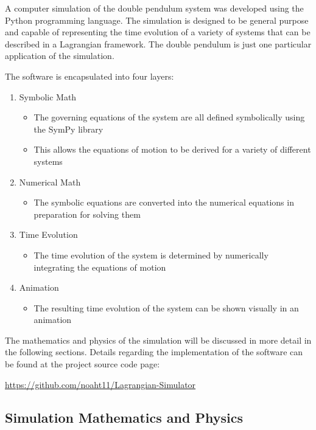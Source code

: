 A computer simulation of the double pendulum system was developed using the Python programming language. The simulation is designed to be general purpose and capable of representing the time evolution of a variety of systems that can be described in a Lagrangian framework. The double pendulum is just one particular application of the simulation.

The software is encapsulated into four layers:

\begin{enumerate}
    \item Symbolic Math
        \begin{itemize}
            \item The governing equations of the system are all defined symbolically using the SymPy library
            \item This allows the equations of motion to be derived for a variety of different systems
        \end{itemize}
    \item Numerical Math
        \begin{itemize}
            \item The symbolic equations are converted into the numerical equations in preparation for solving them
        \end{itemize}
    \item Time Evolution
        \begin{itemize}
            \item The time evolution of the system is determined by numerically integrating the equations of motion
        \end{itemize}
    \item Animation
        \begin{itemize}
            \item The resulting time evolution of the system can be shown visually in an animation
        \end{itemize}
\end{enumerate}

The mathematics and physics of the simulation will be discussed in more detail in the following sections. Details regarding the implementation of the software can be found at the project source code page:

\url{https://github.com/noaht11/Lagrangian-Simulator}

\subsection{Simulation Mathematics and Physics}


